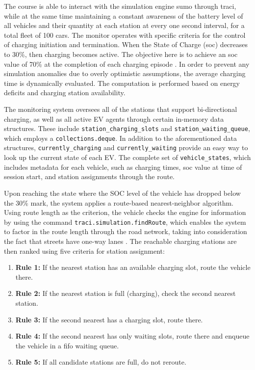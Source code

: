 \documentclass{thesis-library}
\begin{document}
The course is able to interact with the simulation engine \Gls{sumo} through \Gls{traci}, while at the same time maintaining a constant awareness of the battery level of all vehicles and their quantity at each station at every one second interval, for a total fleet of 100 cars. The monitor operates with specific criteria for the control of charging initiation and termination. When the State of Charge (\Gls{soc}) decreases to 30\%, then charging becomes active. The objective here is to achieve an \Gls{soc} value of 70\% at the completion of each charging episode \cite{soc_prediction2021}. In order to prevent any simulation anomalies due to overly optimistic assumptions, the average charging time is dynamically evaluated. The computation is performed based on energy deficits and charging station availability.

The monitoring system oversees all of the stations that support bi-directional charging, as well as all active EV agents through certain in-memory data structures. These include \texttt{station\_\allowbreak charging\_\allowbreak slots} and \texttt{station\_\allowbreak waiting\_\allowbreak queue}, which employs a \texttt{collections.\allowbreak deque}. In addition to the aforementioned data structures, \texttt{currently\_\allowbreak charging} and \texttt{currently\_\allowbreak waiting} provide an easy way to look up the current state of each EV. The complete set of \texttt{vehicle\_\allowbreak states}, which includes metadata for each vehicle, such as charging times, \Gls{soc} value at time of session start, and station assignments through the route.

Upon reaching the state where the SOC level of the vehicle has dropped below the 30\% mark, the system applies a route-based nearest-neighbor algorithm. Using route length as the criterion, the vehicle checks the engine for information by using the command \texttt{traci.\allowbreak simulation.\allowbreak findRoute}, which enables the system to factor in the route length through the road network, taking into consideration the fact that streets have one-way lanes \cite{hua2014adaptive}. The reachable charging stations are then ranked using five criteria for station assignment:

\begin{enumerate}
    \item \textbf{Rule 1:} If the nearest station has an available charging slot, route the vehicle there.
    \item \textbf{Rule 2:} If the nearest station is full (charging), check the second nearest station.
    \item \textbf{Rule 3:} If the second nearest has a charging slot, route there.
    \item \textbf{Rule 4:} If the second nearest has only waiting slots, route there and enqueue the vehicle in a \Gls{fifo} waiting queue.
    \item \textbf{Rule 5:} If all candidate stations are full, do not reroute.
\end{enumerate}
\end{document}
